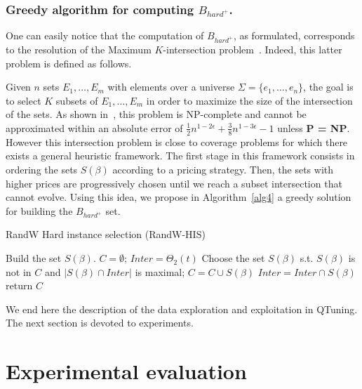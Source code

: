 \documentclass[10pt, conference, compsocconf]{IEEEtran}
\begin{document}
\subsubsection{ Greedy algorithm for computing $B_{hard^+}$.}

One can easily notice that the computation of $B_{hard^+}$, as
formulated, corresponds to the resolution of the Maximum $K$-intersection
problem~\cite{DBLP:journals/ipl/ShiehTY12}.  Indeed, this latter
problem is defined as follows.

Given $n$ sets $E_1,\dots,E_m$ with elements over a universe
$\Sigma = \{ e_1,\dots,e_n  \}$, the goal is to select $K$ subsets of
$E_1,\dots,E_m$ in order to maximize the size of the intersection of
the sets.  As shown in~\cite{DBLP:journals/ipl/ShiehTY12}, this
problem is NP-complete and cannot be approximated within an absolute
error of $\frac{1}{2}n^{1-2\epsilon} + \frac{3}{8}n^{1-3\epsilon} - 1$
unless {\bf P = NP}.  However this intersection problem is close to
coverage problems for which there exists a general heuristic
framework. The first stage in this framework consists in ordering the
sets $S(\beta)$ according to a pricing strategy. Then, the sets with
higher prices are progressively chosen until we reach a subset
intersection that cannot evolve. Using this idea, we propose in
Algorithm~\ref{alg4} a greedy solution for building the $B_{hard^+}$
set.

	\begin{algorithm}
	\caption{\scriptsize RandW Hard instance selection (RandW-HIS)} 	\label{alg4}
	\begin{algorithmic}[1]
	\scriptsize
	\STATE Build the set $S(\beta)$.
	\ENDFOR
	\STATE $C = \emptyset$; $Inter = \Theta_2(t)$
		\STATE Choose the set $S(\beta)$ s.t. $S(\beta)$ is not in $C$ and $|S(\beta) \cap Inter|$ is maximal;
		\STATE $C  = C \cup S(\beta)$
                \STATE $Inter = Inter \cap S(\beta)$
	\ENDWHILE
	\STATE return $C$
	\end{algorithmic}
	\end{algorithm}
	\normalsize

        We end here the description of the data exploration and
        exploitation in QTuning. The next section is devoted to
        experiments.


\section{Experimental evaluation} \label{Proof-of-concept}
\end{document}
